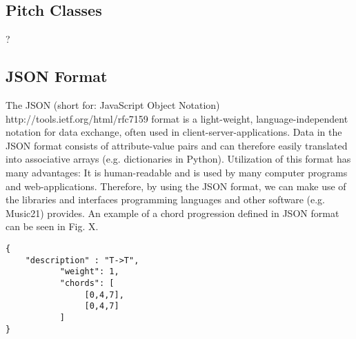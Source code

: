 \subsection{Pitch Classes}
?

\subsection{JSON Format}
The JSON (short for: JavaScript Object Notation) http://tools.ietf.org/html/rfc7159 format is a light-weight, language-independent notation for data exchange, often used in client-server-applications. Data in the JSON format consists of attribute-value pairs and can therefore easily translated into associative arrays (e.g. dictionaries in Python). Utilization of this format has many advantages: It is human-readable and is used by many computer programs and web-applications. Therefore, by using the JSON format, we can make use of the libraries and interfaces programming languages and other software (e.g. Music21) provides. An example of a chord progression defined in JSON format can be seen in Fig. X.

\begin{verbatim}
{
	"description" : "T->T",
           "weight": 1,
           "chords": [
                [0,4,7],
                [0,4,7]
           ]
}
\end{verbatim}